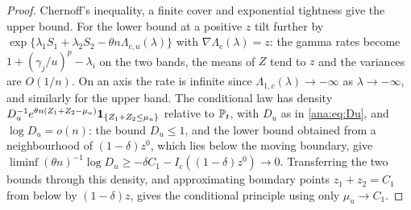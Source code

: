 \begin{proof}
Chernoff's inequality, a finite cover and exponential tightness give the upper bound. For the lower
bound at a positive $z$ tilt further by $\exp\{\lambda_1S_1+\lambda_2S_2-\theta n\Lambda_{c,u}(\lambda)\}$ with $\nabla\Lambda_c(\lambda)=z$: the gamma
rates become $1+(\gamma_j/u)^p-\lambda_i$ on the two bands, the means of $Z$ tend to $z$ and the variances are
$O(1/n)$. On an axis the rate is infinite since $\Lambda_{1,c}(\lambda)\to-\infty$ as $\lambda\to-\infty$, and similarly for the upper
band. The conditional law has density $D_u^{-1}e^{\theta n(Z_1+Z_2-\mu_u)}\mathbf{1}_{\{Z_1+Z_2\le\mu_u\}}$ relative to $\mathbb{P}_t$, with
$D_u$ as in \eqref{ana:eq:Du}, and $\log D_u=o(n)$: the bound $D_u\le1$, and the lower bound obtained from a
neighbourhood of $(1-\delta)z^0$, which lies below the moving boundary, give
$\liminf(\theta n)^{-1}\log D_u\ge-\delta C_1-I_c((1-\delta)z^0)\to0$. Transferring the two bounds through this density,
and approximating boundary points $z_1+z_2=C_1$ from below by $(1-\delta)z$, gives the conditional principle
using only $\mu_u\to C_1$.
\end{proof}

